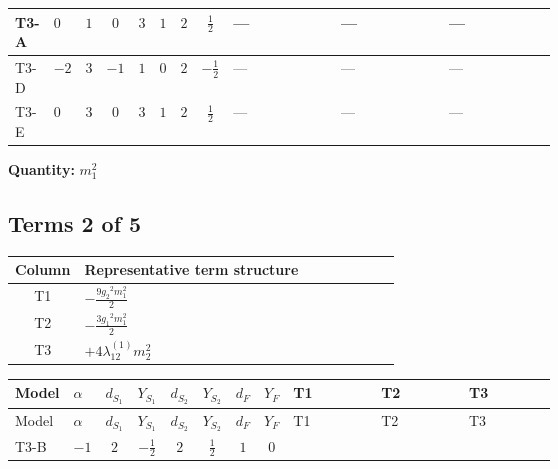 \documentclass[8pt]{article}
\begin{document}
\begin{landscape}
\begin{longtable}{@{}llcccccc >{\raggedright\arraybackslash}p{0.21\linewidth} >{\raggedright\arraybackslash}p{0.21\linewidth} >{\raggedright\arraybackslash}p{0.21\linewidth}@{}}
\midrule
T3-A & $0$ & $1$ & $0$ & $3$ & $1$ & $2$ & $\frac{1}{2}$ & --- & --- & --- \\
\midrule
T3-D & $-2$ & $3$ & $-1$ & $1$ & $0$ & $2$ & $-\frac{1}{2}$ & --- & --- & --- \\
\midrule
T3-E & $0$ & $3$ & $0$ & $3$ & $1$ & $2$ & $\frac{1}{2}$ & --- & --- & --- \\
\midrule
\bottomrule
\end{longtable}
\clearpage
\noindent\textbf{Quantity: }$m_1^2$\par\smallskip
\subsection*{Terms 2 of 5}
\begin{center}
\begin{tabular}{@{}c >{\raggedright\arraybackslash}p{0.82\linewidth}@{}}
\toprule
Column & Representative term structure \\
\midrule
T1 & \(\displaystyle -\frac{9 {g_2}^2 {m_1^2}}{2}\) \\
\midrule
T2 & \(\displaystyle -\frac{3 {g_1}^2 {m_1^2}}{2}\) \\
\midrule
T3 & \(\displaystyle +4 {\lambda_{12}^{(1)}} {m_2^2}\) \\
\midrule
\bottomrule
\end{tabular}
\end{center}
\smallskip
\tiny
\begin{longtable}{@{}llcccccc >{\raggedright\arraybackslash}p{0.21\linewidth} >{\raggedright\arraybackslash}p{0.21\linewidth} >{\raggedright\arraybackslash}p{0.21\linewidth}@{}}
\toprule
Model & $\alpha$ & $d_{S_1}$ & $Y_{S_1}$ & $d_{S_2}$ & $Y_{S_2}$ & $d_F$ & $Y_F$ & T1 & T2 & T3 \\
\midrule
\endfirsthead
\toprule
Model & $\alpha$ & $d_{S_1}$ & $Y_{S_1}$ & $d_{S_2}$ & $Y_{S_2}$ & $d_F$ & $Y_F$ & T1 & T2 & T3 \\
\midrule
\endhead
T3-B & $-1$ & $2$ & $-\frac{1}{2}$ & $2$ & $\frac{1}{2}$ & $1$ & $0$ & \scriptsize\adjustbox{max width=\linewidth}{$\begin{gathered} -\frac{9 {g_2}^2 {m_1^2}}{2}\end{gathered}$} & \scriptsize\adjustbox{max width=\linewidth}{$\begin{gathered} -\frac{3 {g_1}^2 {m_1^2}}{2}\end{gathered}$} & \scriptsize\adjustbox{max width=\linewidth}{$\begin{gathered} +4 {\lambda_{12}^{(1)}} {m_2^2}\end{gathered}$} \\

\end{longtable}
\end{landscape}
\end{document}
